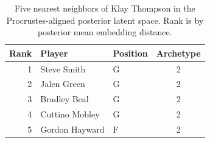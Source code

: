 \begin{table}[htbp]
  \centering\small
  \begin{tabular}{rllc}
    \toprule
    Rank & Player & Position & Archetype \\
    \midrule
    1 & Steve Smith & G & 2 \\
    2 & Jalen Green & G & 2 \\
    3 & Bradley Beal & G & 2 \\
    4 & Cuttino Mobley & G & 2 \\
    5 & Gordon Hayward & F & 2 \\
    \bottomrule
  \end{tabular}
  \caption{Five nearest neighbors of Klay Thompson in the Procrustes-aligned posterior latent space. Rank is by posterior mean embedding distance.}
  \label{tab:Klay_Thompson_neighbors}
\end{table}

